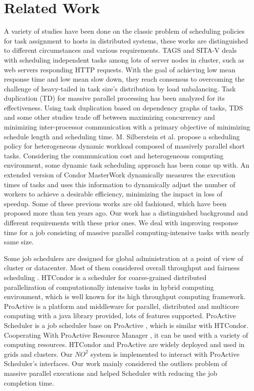 \section{Related Work}

A variety of studies have been done on the classic problem of scheduling policies for task
assignment to hosts in distributed systems, these works are distinguished to different
circumstances and various requirements. TAGS \cite{balter} and SITA-V
\cite{Crovella:1998:TAD:277851.277942} deals with scheduling independent tasks among lots
of server nodes in cluster, such as web servers responding HTTP requests. With the goal of
achieving low mean response time and low mean slow down, they reach consensus to
overcoming the challenge of heavy-tailed in task size's distribution by load unbalancing.
Task duplication (TD) \cite{Manoharan:2001:ETD:373047.373064} for massive parallel
processing has been analyzed for its effectiveness. Using task duplication based on
dependency graphs of tasks, TDS \cite{rohtua} and some other studies \cite{ahmad}
\cite{Dogan:2002:LDB:850943.853100} trade off between maximizing concurrency and
minimizing inter-processor communication with a primary objective of minimizing schedule
length and scheduling time. M. Silberstein et al. \cite{silberstein} propose a scheduling
policy for heterogeneous dynamic workload composed of massively parallel short tasks.
Considering the communication cost and heterogeneous computing environment, some dynamic
task \cite{Ahmad:1991:SLB:126283.126284} \cite{ucar} scheduling approach has been come up
with. An extended version of Condor MasterWork \cite{Heymann:2000:ASM:645440.652833}
dynamically measures the execution times of tasks and uses this information to dynamically
adjust the number of workers to achieve a desirable efficiency, minimizing the impact in
loss of speedup. Some of these previous works are old fashioned, which have been proposed
more than ten years ago. Our work has a distinguished background and different
requirements with these prior ones. We deal with improving response time for a job
consisting of massive parallel computing-intensive tasks with nearly same size.

Some job schedulers are designed for global administration at a point of view of cluster
or datacenter. Most of them considered overall throughput and fairness scheduling
\cite{isard2009}. HTCondor \cite{beowulfbook-condor} is a scheduler for coarse-grained
distributed parallelization of computationally intensive tasks in hybrid computing
environment, which is well known for its high throughput computing framework. ProActive is
a platform and middleware for parallel, distributed and multicore computing with a java
library provided, lots of features supported. ProActive Scheduler \cite{pascheduling} is a
job scheduler base on ProActive \cite{paprogramming} , which is similar with HTCondor.
Cooperating With ProActive Resource Manager \cite{parm} , it can be used with a variety of
computing resources. HTCondor and ProActive are widely deployed and used in grids and
clusters. Our $NO^2$ system is implemented to interact with ProActive Scheduler's
interfaces. Our work mainly considered the outliers problem of massive parallel executions
and helped Scheduler with reducing the job completion time.

